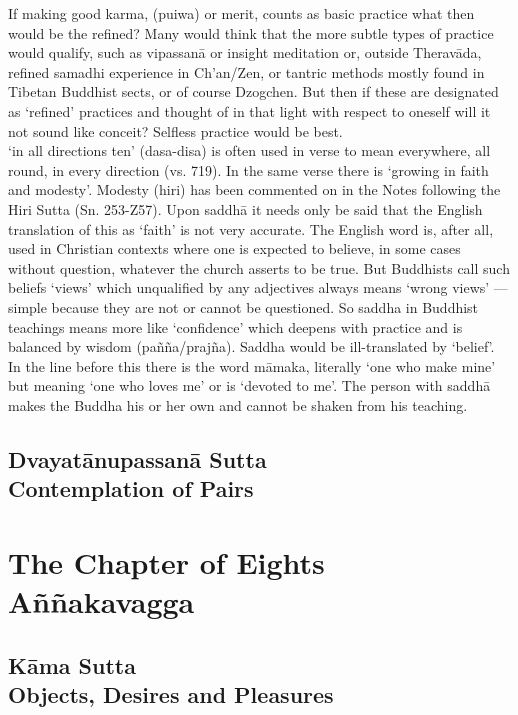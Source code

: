 If making good karma, (puiwa) or merit, counts as basic practice what then would be the refined? Many would think that the more subtle types of practice would qualify, such as vipassan\=a or insight meditation or, outside Therav\=ada, refined samadhi experience in Ch'an/Zen, or tantric methods mostly found in Tibetan Buddhist sects, or of course Dzogchen. But then if these are designated as `refined' practices and thought of in that light with respect to oneself will it not sound like conceit? Selfless practice would be best.\\

`in all directions ten' (dasa-disa) is often used in verse to mean everywhere, all round, in every direction (vs. 719). In the same verse there is `growing in faith and modesty'. Modesty (hiri) has been commented on in the Notes following the Hiri Sutta (Sn. 253-Z57). Upon saddh\=a it needs only be said that the English translation of this as `faith' is not very accurate. The English word is, after all, used in Christian contexts where one is expected to believe, in some cases without question, whatever the church asserts to be true. But Buddhists call such beliefs `views' which unqualified by any adjectives always means `wrong views' — simple because they are not or cannot be questioned. So saddha in Buddhist teachings means more like `confidence' which deepens with practice and is balanced by wisdom (pa\~n\~na/praj\~na). Saddha would be ill-translated by `belief'.\\

In the line before this there is the word m\=amaka, literally `one who make mine' but meaning `one who loves me' or is `devoted to me'. The person with saddh\=a makes the Buddha his or her own and cannot be shaken from his teaching.   
  	

  
\chapter{Dvayat\=anupassan\=a Sutta\\ Contemplation of Pairs}


\part{The Chapter of Eights\\  A\~n\~nakavagga}
   
   
\chapter{K\=ama Sutta\\ Objects, Desires and Pleasures}

